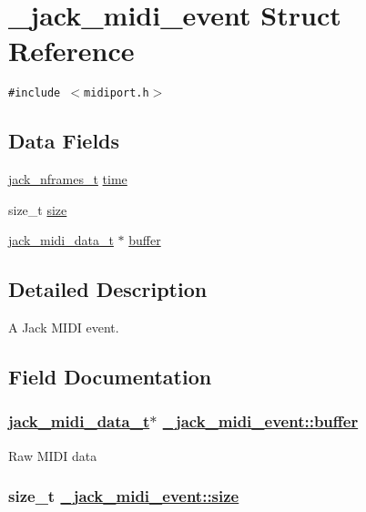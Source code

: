 \hypertarget{struct__jack__midi__event}{
\section{\_\-jack\_\-midi\_\-event Struct Reference}
\label{struct__jack__midi__event}
}
{\tt \#include $<$midiport.h$>$}

\subsection*{Data Fields}
\begin{CompactItemize}
\item 
\hyperlink{types_8h_fe9972a13782c1e282747fdb4bc46f9c}{jack\_\-nframes\_\-t} \hyperlink{struct__jack__midi__event_07cc694b9b3fc636710fa08b6922c42b}{time}
\item 
size\_\-t \hyperlink{struct__jack__midi__event_f7bd60b75b29d79b660a2859395c1a24}{size}
\item 
\hyperlink{midiport_8h_580fcf106adb556fda49b012bd7bde1b}{jack\_\-midi\_\-data\_\-t} $\ast$ \hyperlink{struct__jack__midi__event_7f2db423a49b305459147332fb01cf87}{buffer}
\end{CompactItemize}


\subsection{Detailed Description}
A Jack MIDI event. 



\subsection{Field Documentation}
\hypertarget{struct__jack__midi__event_7f2db423a49b305459147332fb01cf87}{
\subsubsection[buffer]{\setlength{\rightskip}{0pt plus 5cm}\hyperlink{midiport_8h_580fcf106adb556fda49b012bd7bde1b}{jack\_\-midi\_\-data\_\-t}$\ast$ \hyperlink{struct__jack__midi__event_7f2db423a49b305459147332fb01cf87}{\_\-jack\_\-midi\_\-event::buffer}}}
\label{struct__jack__midi__event_7f2db423a49b305459147332fb01cf87}


Raw MIDI data \hypertarget{struct__jack__midi__event_f7bd60b75b29d79b660a2859395c1a24}{
\subsubsection[size]{\setlength{\rightskip}{0pt plus 5cm}size\_\-t \hyperlink{struct__jack__midi__event_f7bd60b75b29d79b660a2859395c1a24}{\_\-jack\_\-midi\_\-event::size}}}
\label{struct__jack__midi__event_f7bd60b75b29d79b660a2859395c1a24}


